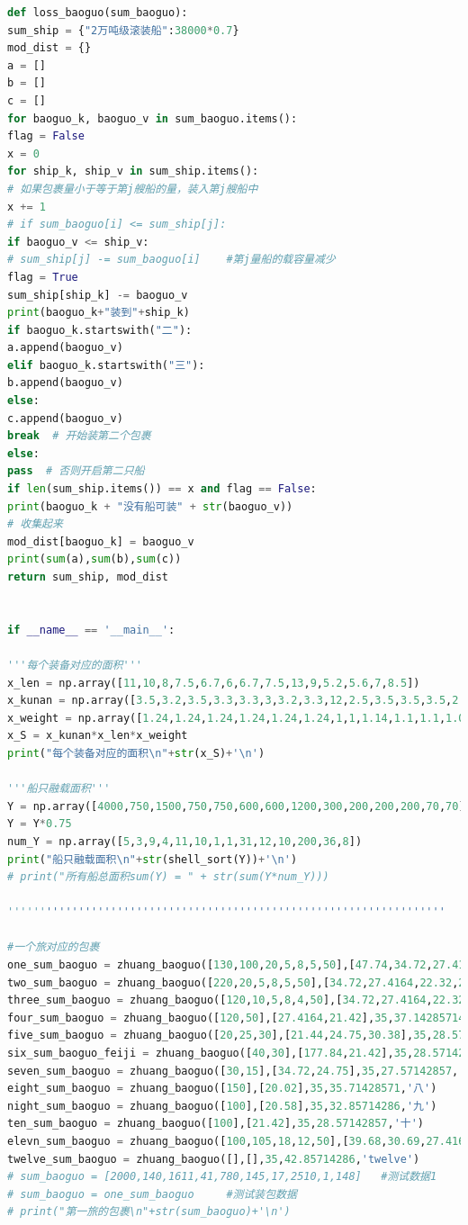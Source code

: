 \documentclass{whutmod}
\begin{document}
\begin{lstlisting}[language=python]
def loss_baoguo(sum_baoguo):
sum_ship = {"2万吨级滚装船":38000*0.7}
mod_dist = {}
a = []
b = []
c = []
for baoguo_k, baoguo_v in sum_baoguo.items():
flag = False
x = 0
for ship_k, ship_v in sum_ship.items():
# 如果包裹量小于等于第j艘船的量，装入第j艘船中
x += 1
# if sum_baoguo[i] <= sum_ship[j]:
if baoguo_v <= ship_v:
# sum_ship[j] -= sum_baoguo[i]    #第j量船的载容量减少
flag = True
sum_ship[ship_k] -= baoguo_v
print(baoguo_k+"装到"+ship_k)
if baoguo_k.startswith("二"):
a.append(baoguo_v)
elif baoguo_k.startswith("三"):
b.append(baoguo_v)
else:
c.append(baoguo_v)
break  # 开始装第二个包裹
else:
pass  # 否则开启第二只船
if len(sum_ship.items()) == x and flag == False:
print(baoguo_k + "没有船可装" + str(baoguo_v))
# 收集起来
mod_dist[baoguo_k] = baoguo_v
print(sum(a),sum(b),sum(c))
return sum_ship, mod_dist


if __name__ == '__main__':

'''每个装备对应的面积'''
x_len = np.array([11,10,8,7.5,6.7,6,6.7,7.5,13,9,5.2,5.6,7,8.5])
x_kunan = np.array([3.5,3.2,3.5,3.3,3.3,3,3.2,3.3,12,2.5,3.5,3.5,3.5,2.4])
x_weight = np.array([1.24,1.24,1.24,1.24,1.24,1.24,1,1,1.14,1.1,1.1,1.05,1.24,1.05])
x_S = x_kunan*x_len*x_weight
print("每个装备对应的面积\n"+str(x_S)+'\n')

'''船只融载面积'''
Y = np.array([4000,750,1500,750,750,600,600,1200,300,200,200,200,70,70])
Y = Y*0.75
num_Y = np.array([5,3,9,4,11,10,1,1,31,12,10,200,36,8])
print("船只融载面积\n"+str(shell_sort(Y))+'\n')
# print("所有船总面积sum(Y) = " + str(sum(Y*num_Y)))

''''''''''''''''''''''''''''''''''''''''''''''''''''''''''''''''''''

#一个旅对应的包裹
one_sum_baoguo = zhuang_baoguo([130,100,20,5,8,5,50],[47.74,34.72,27.4164,22.32,21.44,24.75,21.42],54,43.51851852,'一')
two_sum_baoguo = zhuang_baoguo([220,20,5,8,5,50],[34.72,27.4164,22.32,21.44,24.75,21.42],54,43.51851852,'二')
three_sum_baoguo = zhuang_baoguo([120,10,5,8,4,50],[34.72,27.4164,22.32,21.44,24.75,21.42],54,41.6666667,'三')
four_sum_baoguo = zhuang_baoguo([120,50],[27.4164,21.42],35,37.14285714,'四')
five_sum_baoguo = zhuang_baoguo([20,25,30],[21.44,24.75,30.38],35,28.5714285,'五')
six_sum_baoguo_feiji = zhuang_baoguo([40,30],[177.84,21.42],35,28.57142857,'六')#带飞机的旅，先装！！！！！！！
seven_sum_baoguo = zhuang_baoguo([30,15],[34.72,24.75],35,27.57142857,'七')
eight_sum_baoguo = zhuang_baoguo([150],[20.02],35,35.71428571,'八')
night_sum_baoguo = zhuang_baoguo([100],[20.58],35,32.85714286,'九')
ten_sum_baoguo = zhuang_baoguo([100],[21.42],35,28.57142857,'十')
elevn_sum_baoguo = zhuang_baoguo([100,105,18,12,50],[39.68,30.69,27.4164,22.32,21.42],35,71.42857143,'eleven')
twelve_sum_baoguo = zhuang_baoguo([],[],35,42.85714286,'twelve')
# sum_baoguo = [2000,140,1611,41,780,145,17,2510,1,148]   #测试数据1
# sum_baoguo = one_sum_baoguo     #测试装包数据
# print("第一旅的包裹\n"+str(sum_baoguo)+'\n')


\end{lstlisting}
\end{document}
